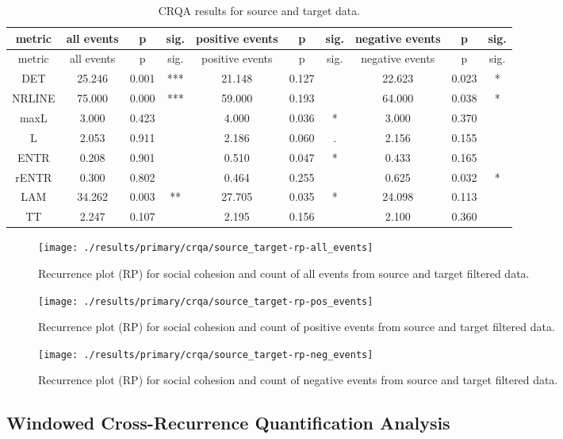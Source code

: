 \documentclass[english,man]{apa6}
\begin{document}
\begin{longtable}[]{@{}cccccccccc@{}}
\caption{CRQA results for source and target data.}\tabularnewline
\toprule
metric & all events & p & sig. & positive events & p & sig. & negative events & p & sig.\tabularnewline
\midrule
\endfirsthead
\toprule
metric & all events & p & sig. & positive events & p & sig. & negative events & p & sig.\tabularnewline
\midrule
\endhead
DET & 25.246 & 0.001 & *** & 21.148 & 0.127 & & 22.623 & 0.023 & *\tabularnewline
NRLINE & 75.000 & 0.000 & *** & 59.000 & 0.193 & & 64.000 & 0.038 & *\tabularnewline
maxL & 3.000 & 0.423 & & 4.000 & 0.036 & * & 3.000 & 0.370 &\tabularnewline
L & 2.053 & 0.911 & & 2.186 & 0.060 & . & 2.156 & 0.155 &\tabularnewline
ENTR & 0.208 & 0.901 & & 0.510 & 0.047 & * & 0.433 & 0.165 &\tabularnewline
rENTR & 0.300 & 0.802 & & 0.464 & 0.255 & & 0.625 & 0.032 & *\tabularnewline
LAM & 34.262 & 0.003 & ** & 27.705 & 0.035 & * & 24.098 & 0.113 &\tabularnewline
TT & 2.247 & 0.107 & & 2.195 & 0.156 & & 2.100 & 0.360 &\tabularnewline
\bottomrule
\end{longtable}

\begin{figure}
\texttt{[image: ./results/primary/crqa/source\_target-rp-all\_events]} \caption{Recurrence plot (RP) for social cohesion and count of all events from source and target filtered data.}\label{fig:plot-rp-source-targ-all}
\end{figure}

\begin{figure}
\texttt{[image: ./results/primary/crqa/source\_target-rp-pos\_events]} \caption{Recurrence plot (RP) for social cohesion and count of positive events from source and target filtered data.}\label{fig:plot-rp-source-targ-pos}
\end{figure}

\begin{figure}
\texttt{[image: ./results/primary/crqa/source\_target-rp-neg\_events]} \caption{Recurrence plot (RP) for social cohesion and count of negative events from source and target filtered data.}\label{fig:plot-rp-source-targ-neg}
\end{figure}

\hypertarget{windowed-cross-recurrence-quantification-analysis-1}{%
\subsection{Windowed Cross-Recurrence Quantification Analysis}\label{windowed-cross-recurrence-quantification-analysis-1}}
\end{document}
